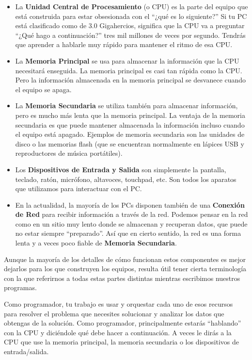 \begin{itemize}

\item La {\bf Unidad Central de Procesamiento} (o CPU) es
la parte del equipo que está construida para estar obsesionada
con el ``¿qué es lo siguiente?'' Si tu PC está clasificado
como de 3.0 Gigahercios, significa que la CPU va a preguntar ``¿Qué hago a continuación?''
tres mil millones de veces por segundo. Tendrás que aprender a hablarle muy
rápido para mantener el ritmo de esa CPU.

\item La {\bf Memoria Principal} se usa para almacenar la información
que la CPU necesitará enseguida. La memoria principal es casi
tan rápida como la CPU. Pero la información almacenada en la memoria
principal se desvanece cuando el equipo se apaga.

\item La {\bf Memoria Secundaria} se utiliza también para almacenar
información, pero es mucho más lenta que la memoria principal.
La ventaja de la memoria secundaria es que puede mantener
almacenada la información incluso cuando el equipo está apagado.
Ejemplos de memoria secundaria son las unidades de disco o las
memorias flash (que se encuentran normalmente en lápices USB y
reproductores de música portátiles).

\item Los {\bf Dispositivos de Entrada y Salida} son simplemente
la pantalla, teclado, ratón, micrófono, altavoces, touchpad, etc.
Son todos los aparatos que utilizamos para interactuar con el PC.

\item En la actualidad, la mayoría de los PCs disponen también de una
{\bf Conexión de Red} para recibir información a través de la red.
Podemos pensar en la red como en un sitio muy lento donde se almacenan
y recuperan datos, que puede no estar siempre ``preparado''. Así que en cierto sentido,
la red es una forma lenta y a veces poco fiable de
{\bf Memoria Secundaria}.

\end{itemize}

Aunque la mayoría de los detalles de cómo funcionan estos componentes es mejor
dejarlos para los que construyen los equipos, resulta útil tener cierta terminología
con la que referirnos a todas estas partes distintas mientras escribimos nuestros programas.

Como programador, tu trabajo es usar y orquestar cada uno de esos
recursos para resolver el problema que necesites solucionar
y analizar los datos que obtengas de la solución. Como programador, principalmente
estarás ``hablando'' con la CPU y diciéndole qué debe hacer a continuación.
A veces le dirás a la CPU que use la memoria principal,
la memoria secundaria o los dispositivos de entrada/salida.

